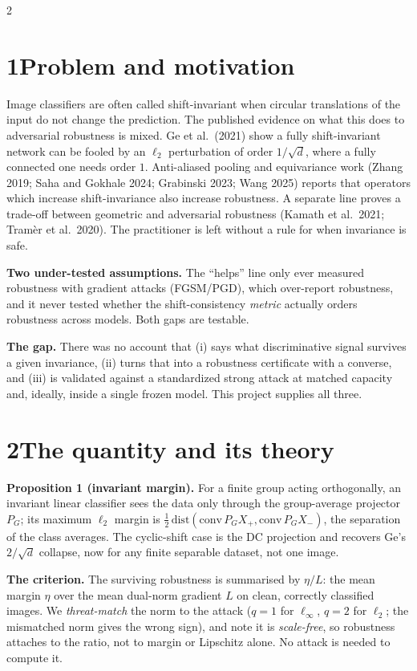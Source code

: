 \documentclass[10pt]{article}
\newcommand{\etaL}{\ensuremath{\eta/L}}
\begin{document}
\vspace{0.2em}
\begin{multicols}{2}

\section*{1\quad Problem and motivation}
Image classifiers are often called shift-invariant when circular translations of the input do not change the prediction. The published evidence on what this does to adversarial robustness is mixed. Ge et al.\ (2021) show a fully shift-invariant network can be fooled by an $\ell_2$ perturbation of order $1/\sqrt{d}$, where a fully connected one needs order $1$. Anti-aliased pooling and equivariance work (Zhang 2019; Saha and Gokhale 2024; Grabinski 2023; Wang 2025) reports that operators which increase shift-invariance also increase robustness. A separate line proves a trade-off between geometric and adversarial robustness (Kamath et al.\ 2021; Tram\`er et al.\ 2020). The practitioner is left without a rule for when invariance is safe.

\textbf{Two under-tested assumptions.} The ``helps'' line only ever measured robustness with gradient attacks (FGSM/PGD), which over-report robustness, and it never tested whether the shift-consistency \emph{metric} actually orders robustness across models. Both gaps are testable.

\textbf{The gap.} There was no account that (i) says what discriminative signal survives a given invariance, (ii) turns that into a robustness certificate with a converse, and (iii) is validated against a standardized strong attack at matched capacity and, ideally, inside a single frozen model. This project supplies all three.

\section*{2\quad The quantity and its theory}
\textbf{Proposition 1 (invariant margin).} For a finite group acting orthogonally, an invariant linear classifier sees the data only through the group-average projector $P_G$; its maximum $\ell_2$ margin is $\tfrac12\,\mathrm{dist}(\mathrm{conv}\,P_GX_+,\mathrm{conv}\,P_GX_-)$, the separation of the class averages. The cyclic-shift case is the DC projection and recovers Ge's $2/\sqrt d$ collapse, now for any finite separable dataset, not one image.

\textbf{The criterion.} The surviving robustness is summarised by $\etaL$: the mean margin $\eta$ over the mean dual-norm gradient $L$ on clean, correctly classified images. We \emph{threat-match} the norm to the attack ($q{=}1$ for $\ell_\infty$, $q{=}2$ for $\ell_2$; the mismatched norm gives the wrong sign), and note it is \emph{scale-free}, so robustness attaches to the ratio, not to margin or Lipschitz alone. No attack is needed to compute it.


\end{multicols}
\end{document}
